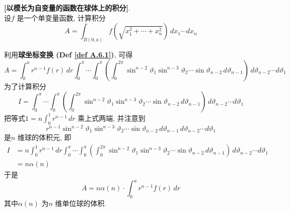 	\begin{example}\label{ex A.6.1}
		\textbf{[以模长为自变量的函数在球体上的积分]}. \\
		设$f$ 是一个单变量函数, 计算积分
		\[ A = \int_{B(0 , a)} f\left( \sqrt{x_{1}^2 + \cdots + x_{n}^2} \right) \, dx_1 \cdots dx_n \]
		
		\newpage
		
		\begin{solution}
			利用\textbf{球坐标变换 (Def \ref{def A.6.1})}, 可得
			\[ A = \int_{0}^a r^{n - 1} f(r) \, dr 
			\int_{0}^\pi \cdots \int_{0}^\pi \left( \int_{0}^{2\pi} \sin^{n - 2} \vartheta_1 \sin^{n - 3} \vartheta_{2} \cdots \sin \vartheta_{n - 2} \, d \vartheta_{n - 1} \right) \, d \vartheta_{n - 2} \cdots d\vartheta_1 \]
			为了计算积分
			\[ I = \int_{0}^\pi \cdots \int_{0}^\pi \left( \int_{0}^{2\pi} \sin^{n - 2} \vartheta_1 \sin^{n - 3} \vartheta_{2} \cdots \sin \vartheta_{n - 2} \, d \vartheta_{n - 1} \right) \, d \vartheta_{n - 2} \cdots d\vartheta_1 \]
			把等式$1 = n \int_{0}^1 r^{n - 1} \, dr$ 乘上式两端, 并注意到
			\[ r^{n - 1} \sin^{n - 2} \vartheta_1 \sin^{n - 3} \vartheta_{2} \cdots \sin \vartheta_{n - 2} \, d \vartheta_{n - 1} \, d \vartheta_{n - 2} \cdots d\vartheta_1 \]
			是$n$ 维球的体积元, 即
			\begin{align}
				I 
				&= n \int_{0}^1 r^{n - 1} \, dr \int_{0}^\pi \cdots \int_{0}^\pi \left( \int_{0}^{2\pi} \sin^{n - 2} \vartheta_1 \sin^{n - 3} \vartheta_{2} \cdots \sin \vartheta_{n - 2} \, d \vartheta_{n - 1} \right) \, d \vartheta_{n - 2} \cdots d\vartheta_1 \\
				&= n \alpha(n)
			\end{align}
			于是
			\[ A = n \alpha(n) \cdot \int_{0}^a r^{n - 1} f(r) \, dr \]
			其中$\alpha(n)$ 为$n$ 维单位球的体积.
		\end{solution}
	\end{example}
	
	







	\ifx\allfiles\undefined

\fi